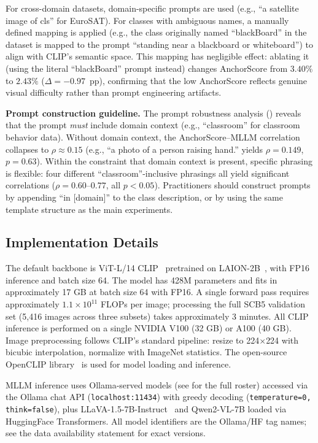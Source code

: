 \documentclass[a4paper,fleqn]{cas-sc}
\begin{document}
For cross-domain datasets, domain-specific prompts are used (e.g., ``a satellite image of {cls}'' for EuroSAT). For classes with ambiguous names, a manually defined mapping is applied (e.g., the class originally named ``blackBoard'' in the dataset is mapped to the prompt ``standing near a blackboard or whiteboard'') to align with CLIP's semantic space. This mapping has negligible effect: ablating it (using the literal ``blackBoard'' prompt instead) changes AnchorScore from $3.40\%$ to $2.43\%$ ($\Delta=-0.97$~pp), confirming that the low AnchorScore reflects genuine visual difficulty rather than prompt engineering artifacts.

\textbf{Prompt construction guideline.} The prompt robustness analysis () reveals that the prompt \emph{must} include domain context (e.g., ``classroom'' for classroom behavior data). Without domain context, the AnchorScore--MLLM correlation collapses to $\rho\approx0.15$ (e.g., ``a photo of a person raising hand.'' yields $\rho=0.149$, $p=0.63$). Within the constraint that domain context is present, specific phrasing is flexible: four different ``classroom''-inclusive phrasings all yield significant correlations ($\rho=0.60$--$0.77$, all $p<0.05$). Practitioners should construct prompts by appending ``in [domain]'' to the class description, or by using the same template structure as the main experiments.

\subsection{Implementation Details}

The default backbone is ViT-L/14 CLIP~\cite{radford2021clip} pretrained on LAION-2B~\cite{schuhmann2022laion5b}, with FP16 inference and batch size 64. The model has 428M parameters and fits in approximately 17 GB at batch size 64 with FP16. A single forward pass requires approximately $1.1 \times 10^{11}$ FLOPs per image; processing the full SCB5 validation set (5{,}416 images across three subsets) takes approximately 3 minutes. All CLIP inference is performed on a single NVIDIA V100 (32 GB) or A100 (40 GB). Image preprocessing follows CLIP's standard pipeline: resize to 224$\times$224 with bicubic interpolation, normalize with ImageNet statistics. The open-source OpenCLIP library~\cite{cherti2023reproducible} is used for model loading and inference.

MLLM inference uses Ollama-served models (see  for the full roster) accessed via the Ollama chat API (\texttt{localhost:11434}) with greedy decoding (\texttt{temperature=0, think=false}), plus LLaVA-1.5-7B-Instruct~\cite{liu2023visual} and Qwen2-VL-7B loaded via HuggingFace Transformers. All model identifiers are the Ollama/HF tag names; see the data availability statement for exact versions.
\end{document}
